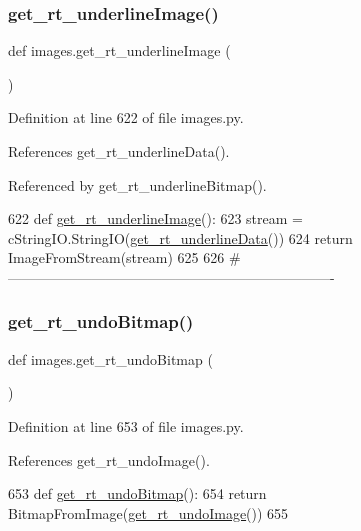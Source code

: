 \subsubsection{\texorpdfstring{get\+\_\+rt\+\_\+underline\+Image()}{get\_rt\_underlineImage()}}
{\footnotesize\ttfamily def images.\+get\+\_\+rt\+\_\+underline\+Image (\begin{DoxyParamCaption}{ }\end{DoxyParamCaption})}



Definition at line 622 of file images.\+py.



References get\+\_\+rt\+\_\+underline\+Data().



Referenced by get\+\_\+rt\+\_\+underline\+Bitmap().


\begin{DoxyCode}
622 \textcolor{keyword}{def }\hyperlink{namespaceimages_ac79f659a15f37cc800164b1aa57da45a}{get\_rt\_underlineImage}():
623     stream = cStringIO.StringIO(\hyperlink{namespaceimages_a016500491499878fd6993077288fadc0}{get\_rt\_underlineData}())
624     \textcolor{keywordflow}{return} ImageFromStream(stream)
625 
626 \textcolor{comment}{#----------------------------------------------------------------------}
\end{DoxyCode}
\mbox{\label{namespaceimages_add871bca6a3a5a6fca4e6be7a078e0db}} 
\subsubsection{\texorpdfstring{get\+\_\+rt\+\_\+undo\+Bitmap()}{get\_rt\_undoBitmap()}}
{\footnotesize\ttfamily def images.\+get\+\_\+rt\+\_\+undo\+Bitmap (\begin{DoxyParamCaption}{ }\end{DoxyParamCaption})}



Definition at line 653 of file images.\+py.



References get\+\_\+rt\+\_\+undo\+Image().


\begin{DoxyCode}
653 \textcolor{keyword}{def }\hyperlink{namespaceimages_add871bca6a3a5a6fca4e6be7a078e0db}{get\_rt\_undoBitmap}():
654     \textcolor{keywordflow}{return} BitmapFromImage(\hyperlink{namespaceimages_a7aac75ffcce6d5a3ebe9637e743169c7}{get\_rt\_undoImage}())
655 
\end{DoxyCode}
\mbox{\label{namespaceimages_a9c965a0dce12c259b4545a995e0c4b73}} 
